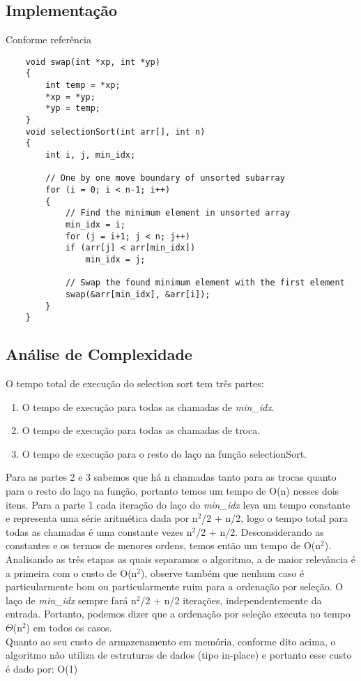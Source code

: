 \documentclass[12pt]{article}
\begin{document}
\subsection{Implementação}
    Conforme referência \cite{selectionSort}
    \begin{lstlisting}
    void swap(int *xp, int *yp)  
    {  
        int temp = *xp;  
        *xp = *yp;  
        *yp = temp;  
    }  
    void selectionSort(int arr[], int n)  
    {  
        int i, j, min_idx;  
      
        // One by one move boundary of unsorted subarray  
        for (i = 0; i < n-1; i++)  
        {  
            // Find the minimum element in unsorted array  
            min_idx = i;  
            for (j = i+1; j < n; j++)  
            if (arr[j] < arr[min_idx])  
                min_idx = j;  
      
            // Swap the found minimum element with the first element
            swap(&arr[min_idx], &arr[i]);  
        }  
    }  
    \end{lstlisting}
\subsection{Análise de Complexidade}
O tempo total de execução do selection sort tem três partes:\cite{selectionSortAnalysis}
\begin{enumerate}
    \item O tempo de execução para todas as chamadas de \textit{min\_idx}.
    \item O tempo de execução para todas as chamadas de troca.
    \item O tempo de execução para o resto do laço na função selectionSort.
\end{enumerate}
Para as partes 2 e 3 sabemos que há n chamadas tanto para as trocas quanto para o resto do laço na função, portanto temos um tempo de O(n) nesses dois itens. Para a parte 1 cada iteração do laço do \textit{min\_idx} leva um tempo constante e representa uma série aritmética dada por n$^2$/2 + n/2, logo o tempo total para todas as chamadas é uma constante vezes n$^2$/2 + n/2. Desconsiderando as constantes e os termos de menores ordens, temos então um tempo de O(n$^2$). \\
Analisando as três etapas as quais separamos o algoritmo, a de maior relevância é a primeira com o custo de O(n$^2$), observe também que nenhum caso é particularmente bom ou particularmente ruim para a ordenação por seleção. O laço de \textit{min\_idx} sempre fará n$^2$/2 + n/2 iterações, independentemente da entrada. Portanto, podemos dizer que a ordenação por seleção executa no tempo $\Theta$(n$^2$) em todos os casos.\\
Quanto ao seu custo de armazenamento em memória, conforme dito acima, o algoritmo não utiliza de estruturas de dados (tipo in-place) e portanto esse custo é dado por: O(1)
\end{document}
